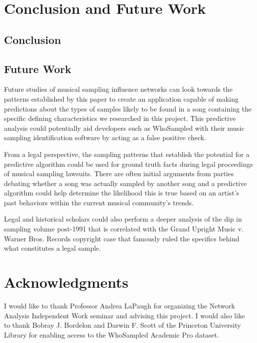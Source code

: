\documentclass[pageno]{jpaper}
\begin{document}
\section{Conclusion and Future Work}
\subsection{Conclusion}
\subsection{Future Work}
Future studies of musical sampling influence networks can look towards the patterns established by this paper to create an application capable of making predictions about the types of samples likely to be found in a song containing the specific defining characteristics we researched in this project. This predictive analysis could potentially aid developers such as WhoSampled with their music sampling identification software by acting as a false positive check.

From a legal perspective, the sampling patterns that establish the potential for a predictive algorithm could be used for ground truth facts during legal proceedings of musical sampling lawsuits. There are often initial arguments from parties debating whether a song was actually sampled by another song and a predictive algorithm could help determine the likelihood this is true based on an artist's past behaviors within the current musical community's trends.

Legal and historical scholars could also perform a deeper analysis of the dip in sampling volume post-1991 that is correlated with the Grand Upright Music v. Warner Bros. Records copyright case that famously ruled the specifics behind what constitutes a legal sample.
\section{Acknowledgments}
I would like to thank Professor Andrea LaPaugh for organizing the Network Analysis Independent Work seminar and advising this project. I would also like to thank Bobray J. Bordelon and Darwin F. Scott of the Princeton University Library for enabling access to the WhoSampled Academic Pro dataset.
\nocite{*}


\end{document}
